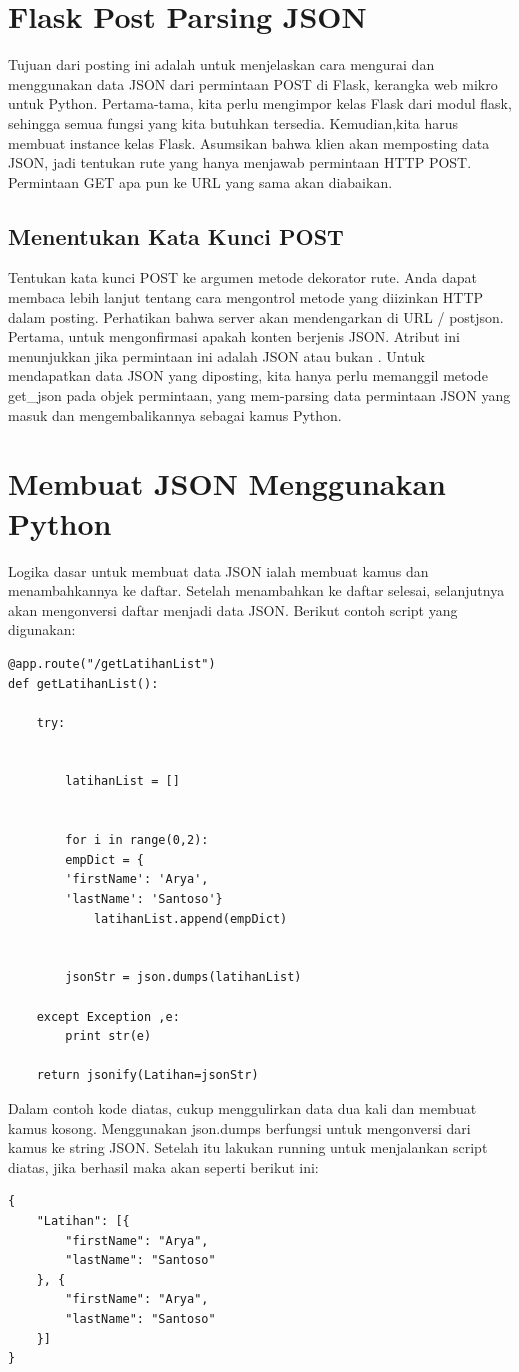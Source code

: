 \section{Flask Post Parsing JSON}
Tujuan dari posting ini adalah untuk menjelaskan cara mengurai dan menggunakan data JSON dari permintaan POST di Flask, kerangka web mikro untuk Python. Pertama-tama, kita perlu mengimpor kelas Flask dari modul flask, sehingga semua fungsi yang kita butuhkan tersedia. Kemudian,kita harus membuat instance kelas Flask. Asumsikan bahwa klien akan memposting data JSON, jadi tentukan rute yang hanya menjawab permintaan HTTP POST. Permintaan GET apa pun ke URL yang sama akan diabaikan\cite{dwyer2016flask}.

\subsection{Menentukan Kata Kunci POST}
Tentukan kata kunci POST ke argumen metode dekorator rute. Anda dapat membaca lebih lanjut tentang cara mengontrol metode yang diizinkan HTTP dalam posting. Perhatikan  bahwa server akan mendengarkan di URL / postjson.  Pertama, untuk mengonfirmasi apakah konten berjenis JSON. Atribut ini menunjukkan jika permintaan ini adalah JSON atau bukan . Untuk mendapatkan data JSON yang diposting, kita hanya perlu memanggil metode get\_json pada objek permintaan, yang mem-parsing data permintaan JSON yang masuk dan mengembalikannya sebagai kamus Python\cite{dwyer2016flask}.

\section{Membuat JSON Menggunakan Python}
Logika dasar untuk membuat data JSON ialah membuat kamus dan menambahkannya ke daftar. Setelah menambahkan ke daftar selesai, selanjutnya akan mengonversi daftar menjadi data JSON. Berikut contoh script yang digunakan:
\begin{verbatim}
@app.route("/getLatihanList")
def getLatihanList():

    try:


        latihanList = []


        for i in range(0,2):
        empDict = {
        'firstName': 'Arya',
        'lastName': 'Santoso'}
            latihanList.append(empDict)


        jsonStr = json.dumps(latihanList)

    except Exception ,e:
        print str(e)

    return jsonify(Latihan=jsonStr)
\end{verbatim}
Dalam contoh kode diatas, cukup menggulirkan data dua kali dan membuat kamus kosong. Menggunakan json.dumps berfungsi untuk mengonversi dari kamus ke string JSON. Setelah itu lakukan running untuk menjalankan script diatas, jika berhasil maka akan seperti berikut ini:
\begin{verbatim}
{
    "Latihan": [{
        "firstName": "Arya",
        "lastName": "Santoso"
    }, {
        "firstName": "Arya",
        "lastName": "Santoso"
    }]
}
\end{verbatim}

